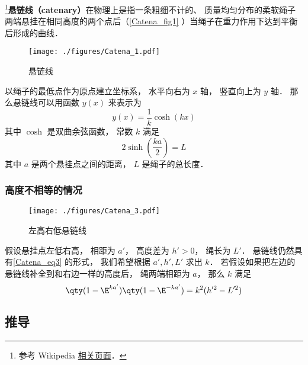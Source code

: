 

\footnote{参考 Wikipedia \href{https://en.wikipedia.org/wiki/Catenary}{相关页面}．}\textbf{悬链线（catenary）}在物理上是指一条粗细不计的、 质量均匀分布的柔软绳子两端悬挂在相同高度的两个点后（\autoref{Catena_fig1} ）当绳子在重力作用下达到平衡后形成的曲线．

\begin{figure}[ht]
\centering
\texttt{[image: ./figures/Catena\_1.pdf]}
\caption{悬链线} \label{Catena_fig1}
\end{figure}

以绳子的最低点作为原点建立坐标系， 水平向右为 $x$ 轴， 竖直向上为 $y$ 轴． 那么悬链线可以用函数 $y(x)$ 来表示为
\begin{equation}\label{Catena_eq3}
y(x) = \frac{1}{k}\cosh(kx)
\end{equation}
其中 $\cosh$ 是双曲余弦函数， 常数 $k$ 满足
\begin{equation}
2\sinh(\frac{ka}{2}) = L
\end{equation}
其中 $a$ 是两个悬挂点之间的距离， $L$ 是绳子的总长度．

\subsubsection{高度不相等的情况}
\begin{figure}[ht]
\centering
\texttt{[image: ./figures/Catena\_3.pdf]}
\caption{左高右低悬链线} \label{Catena_fig3}
\end{figure}
假设悬挂点左低右高， 相距为 $a'$， 高度差为 $h' > 0$， 绳长为 $L'$． 悬链线仍然具有\autoref{Catena_eq3} 的形式， 我们希望根据 $a', h', L'$ 求出 $k$． 若假设如果把左边的悬链线补全到和右边一样的高度后， 绳两端相距为 $a$， 那么 $k$ 满足
\begin{equation}\label{Catena_eq6}
\qty(1-\E^{ka'})\qty(1-\E^{-ka'}) = k^2(h'^2 - L'^2)
\end{equation}

\subsection{推导}


